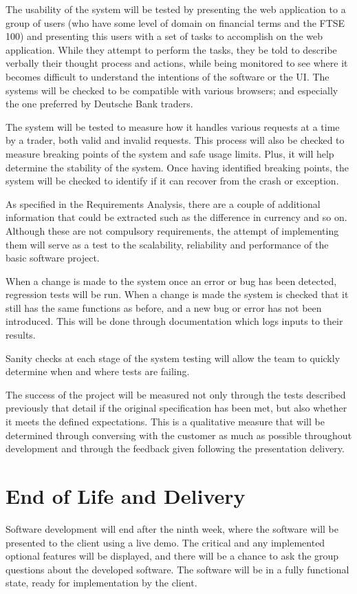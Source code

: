 \documentclass[]{IEEEtran}
\begin{document}
The usability of the system will be tested by presenting the web application to a group of users (who have some level of domain on financial terms and the FTSE 100) and presenting this users with a set of tasks to accomplish on the web application. While they attempt to perform the tasks, they be told to describe verbally their thought process and actions, while being monitored to see where it becomes difficult to understand the intentions of the software or the UI.
The systems will be checked to be compatible with various browsers; and especially the one preferred by Deutsche Bank traders.  

The system will be tested to measure how it handles various requests at a time by a trader, both valid and invalid requests. This process will also be checked to measure breaking points of the system and safe usage limits. Plus, it will help determine the stability of the system. Once having identified breaking points, the system will be checked to identify if it can recover from the crash or exception.

As specified in the Requirements Analysis, there are a couple of additional information that could be extracted such as the difference in currency and so on. Although these are not compulsory requirements, the attempt of implementing them will serve as a test to the scalability, reliability and performance of the basic software project.

When a change is made to the system once an error or bug has been detected, regression tests will be run. When a change is made the system is checked that it still has the same functions as before, and a new bug or error has not been introduced. This will be done through documentation which logs inputs to their results.

Sanity checks at each stage of the system testing will allow the team to quickly determine when and where tests are failing.

The success of the project will be measured not only through the tests described previously that detail if the original specification has been met, but also whether it meets the defined expectations. This is a qualitative measure that will be determined through conversing with the customer as much as possible throughout development and through the feedback given following the presentation delivery. 

\section{End of Life and Delivery}
	Software development will end after the ninth week, where the software will be presented to the client using a live demo. The critical and any implemented optional features will be displayed, and there will be a chance to ask the group questions about the developed software. The software will be in a fully functional state, ready for implementation by the client. 
	
\end{document}
